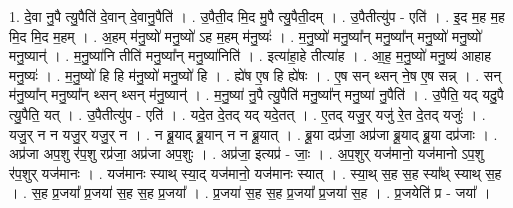 \documentclass[17pt]{extarticle}
\begin{document}
1. दे॒वा नु॒पै त्यु॒पैति॑ दे॒वान् दे॒वानु॒पैति॑ । . उ॒पैती॒द मि॒द मु॒पै त्यु॒पैती॒दम् । . उ॒पैतीत्यु॑प - एति॑ । . इ॒द म॒ह म॒ह मि॒द मि॒द म॒हम् । . अ॒हम् म॑नु॒ष्यो॑ मनु॒ष्यो॑ ऽह म॒हम् म॑नु॒ष्यः॑ । . म॒नु॒ष्यो॑ मनु॒ष्या᳚न् मनु॒ष्या᳚न् मनु॒ष्यो॑ मनु॒ष्यो॑ मनु॒ष्यान्॑ । . म॒नु॒ष्या॑नि तीति॑ मनु॒ष्या᳚न् मनु॒ष्या॑निति॑ । . इत्या॑हा॒हे तीत्या॑ह । . आ॒ह॒ म॒नु॒ष्यो॑ मनु॒ष्य॑ आहाह मनु॒ष्यः॑ । . म॒नु॒ष्यो॑ हि हि म॑नु॒ष्यो॑ मनु॒ष्यो॑ हि । . ह्ये॑ष ए॒ष हि ह्ये॑षः । . ए॒ष सन् थ्सन् ने॒ष ए॒ष सन्न् । . सन् म॑नु॒ष्या᳚न् मनु॒ष्या᳚न् थ्सन् थ्सन् म॑नु॒ष्यान्॑ । . म॒नु॒ष्या॑ नु॒पै त्यु॒पैति॑ मनु॒ष्या᳚न् मनु॒ष्या॑ नु॒पैति॑ । . उ॒पैति॒ यद् यदु॒पै त्यु॒पैति॒ यत् । . उ॒पैतीत्यु॑प - एति॑ । . यदे॒त दे॒तद् यद् यदे॒तत् । . ए॒तद् यजु॒र् यजु॑ रे॒त दे॒तद् यजुः॑ । . यजु॒र् न न यजु॒र् यजु॒र् न । . न ब्रू॒याद् ब्रू॒यान् न न ब्रू॒यात् । . ब्रू॒या दप्र॑जा॒ अप्र॑जा ब्रू॒याद् ब्रू॒या दप्र॑जाः । . अप्र॑जा अप॒शु र॑प॒शु रप्र॑जा॒ अप्र॑जा अप॒शुः । . अप्र॑जा॒ इत्यप्र॑ - जाः॒ । . अ॒प॒शुर् यज॑मानो॒ यज॑मानो ऽप॒शु र॑प॒शुर् यज॑मानः । . यज॑मानः स्याथ् स्या॒द् यज॑मानो॒ यज॑मानः स्यात् । . स्या॒थ् स॒ह स॒ह स्या᳚थ् स्याथ् स॒ह । . स॒ह प्र॒जया᳚ प्र॒जया॑ स॒ह स॒ह प्र॒जया᳚ । . प्र॒जया॑ स॒ह स॒ह प्र॒जया᳚ प्र॒जया॑ स॒ह । . प्र॒जयेति॑ प्र - जया᳚ । \newline
\end{document}
